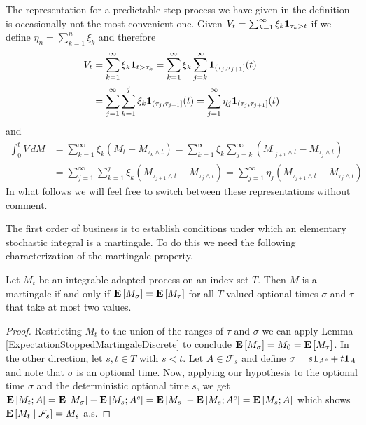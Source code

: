 The representation for a predictable step process we have given in the definition is occasionally not the most convenient one.  Given $V_t = \sum_{k=1}^\infty \xi_k \characteristic{\tau_{k} > t}$ if we define $\eta_n = \sum_{k=1}^n \xi_k$ and therefore 
\begin{align*}
V_t &= \sum_{k=1}^\infty \xi_k \characteristic{t > \tau_k} = \sum_{k=1}^\infty \xi_k \sum_{j=k}^\infty \characteristic{(\tau_j, \tau_{j+1}]}(t)  \\
&= \sum_{j=1}^\infty \sum_{k=1}^j \xi_k \characteristic{(\tau_j, \tau_{j+1}]}(t)  = \sum_{j=1}^\infty \eta_j \characteristic{(\tau_j, \tau_{j+1}]}(t)  \\
\end{align*}
and 
\begin{align*}
\int_0^t V \, dM &= \sum_{k=1}^\infty \xi_k \left(M_{t} - M_{\tau_k \wedge t} \right) = \sum_{k=1}^\infty \xi_k \sum_{j=k}^\infty \left(M_{\tau_{j+1} \wedge t} - M_{\tau_j \wedge t} \right)  \\
&= \sum_{j=1}^\infty \sum_{k=1}^j \xi_k \left(M_{\tau_{j+1} \wedge t} - M_{\tau_j \wedge t} \right) = \sum_{j=1}^\infty \eta_j \left(M_{\tau_{j+1} \wedge t} - M_{\tau_j \wedge t} \right)
\end{align*}
In what follows we will feel free to switch between these representations without comment.

The first order of business is to establish conditions under which an elementary stochastic integral is a martingale.  To do this we need the following characterization of the martingale property.  
\begin{lem}\label{MartingaleOptionalTimeCriterion}Let $M_t$ be an integrable adapted process on an index set $T$.  Then $M$ is a martingale if and only if $\expectation{M_\sigma} = \expectation{M_\tau}$ for all $T$-valued optional times $\sigma$ and $\tau$ that take at most two values.
\end{lem}
\begin{proof}
Restricting $M_t$ to the union of the ranges of $\tau$ and $\sigma$ we can apply Lemma \ref{ExpectationStoppedMartingaleDiscrete} to conclude $\expectation{M_\sigma} = M_0 = \expectation{M_\tau}$.  In the other direction, let $s,t \in T$ with $s < t$.  Let $A \in \mathcal{F}_s$ and define $\sigma = s \characteristic{A^c} + t \characteristic{A}$ and note that $\sigma$ is an optional time.  Now, applying our hypothesis to the optional time $\sigma$ and the deterministic optional time $s$,  we get $\expectation{M_t ; A} = \expectation{M_\sigma} - \expectation{M_s; A^c}  = \expectation{M_s} - \expectation{M_s; A^c}  = \expectation{M_s; A}$ which shows $\cexpectationlong{\mathcal{F}_s}{M_t} = M_s$ a.s.
\end{proof}

